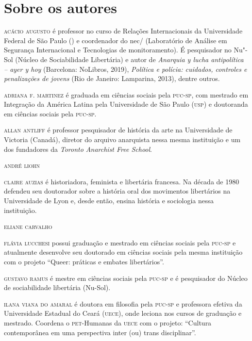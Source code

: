 \chapter{Sobre os autores}

\textsc{acácio augusto} é professor no curso de Relações Internacionais da
  Universidade Federal de São Paulo () e coordenador do
  nec/ (Laboratório de Análise em Segurança Internacional e
  Tecnologias de monitoramento). É pesquisador no Nu"-Sol
  (Núcleo de Sociabilidade Libertária) e autor de
  \emph{Anarquia y lucha antipolítica -- ayer y hoy} (Barcelona:
    NoLibros, 2019), \emph{Política e polícia: cuidados, controles e
  penalizações de jovens} (Rio de Janeiro: Lamparina, 2013), dentre
  outros.

\bigskip
\noindent\textsc{adriana f. martinez} é graduada em ciências sociais pela \textsc{puc-sp}, com mestrado em Integração da América Latina pela Universidade de São Paulo (\textsc{usp}) e doutoranda em ciências sociais pela \textsc{puc-sp}.

\bigskip
\noindent\textsc{allan antliff} é professor pesquisador de história da arte na Universidade de Victoria (Canadá), diretor do arquivo anarquista nessa mesma instituição e um dos fundadores da \textit{Toronto Anarchist Free School}.

\bigskip
\noindent\textsc{andré liohn}

\bigskip
\noindent\textsc{claire auzias} é historiadora, feminista e libertária francesa. Na década de 1980 defendeu seu doutorador sobre a história oral dos movimentos libertários na Universidade de Lyon e, desde então, ensina história e sociologia nessa instituição.

\bigskip
\noindent\textsc{eliane carvalho}

\bigskip
\noindent\textsc{flávia lucchesi} possui graduação e mestrado em ciências sociais pela \textsc{puc-sp} e atualmente desenvolve seu doutorado em ciências sociais pela mesma instituição com o projeto ``Queer: práticas e embates libertários''.

\bigskip
\noindent\textsc{gustavo ramus} é mestre em ciências sociais pela \textsc{puc-sp} e é pesquisador do  Núcleo de sociabilidade libertária (Nu-Sol).

\bigskip
\noindent\textsc{ilana viana do amaral} é doutora em filosofia pela \textsc{puc-sp} e professora efetiva da Universidade Estadual do Ceará (\textsc{uece}), onde leciona nos cursos de graduação e mestrado. Coordena o \textsc{pet}-Humanas da \textsc{uece} com o projeto: ``Cultura contemporânea em uma perspectiva inter (ou) trans disciplinar''.

